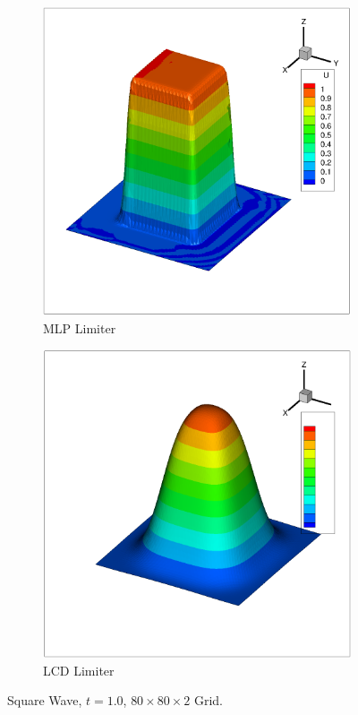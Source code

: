 \begin{figure}
  \begin{subfigure}{.5\textwidth}
    \centering
    \includegraphics[width=.7\linewidth]{./Pho/Chp3/square_MLP_mesh80_3D.eps}
    \caption{MLP Limiter}
    \label{fig:sfig1}
  \end{subfigure}%
  \begin{subfigure}{.5\textwidth}
    \centering
    \includegraphics[width=.7\linewidth]{./Pho/Chp3/square_Barth_mesh80_3D.eps}
    \caption{LCD Limiter}
    \label{fig:sfig2}
  \end{subfigure}
  \caption{Square Wave, $t=1.0$, $80\times 80 \times 2$ Grid.}
  \label{fig:square-wave-test-case}
\end{figure}

